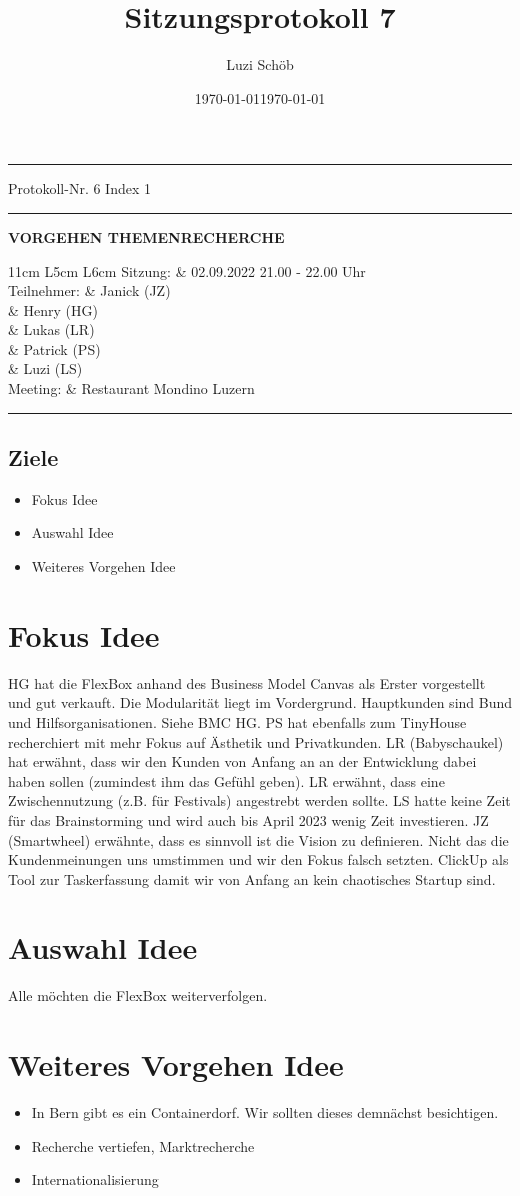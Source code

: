 \documentclass[10pt]{extarticle}
\date{}
\date{\today}
\makeatletter
\renewenvironment{abstract}
 {\par\noindent\ignorespaces}
 {\par\medskip}
\renewcommand{\maketitle}{\setlength{\parindent}{0pt}
\begin{flushleft}
  \huge\@title
  \par\vspace{1cm}
  \normalsize\@author
  \vspace{1cm}  
  
  \hrule
  \begin{minipage}[t]{\textwidth}
    \begin{minipage}[t]{0.25\textwidth}
    \vspace{0.3cm}
	Protokoll-Nr. 6 
	Index 1
    \vspace{0.3cm}
	\hrule
	\vspace{0.3cm}
	\date{\today}
	\vspace{0.3cm}
	\end{minipage}
	\begin{minipage}[t]{0.05\textwidth}
	 \hfill
	\end{minipage}
	\begin{minipage}[t]{0.70\textwidth}
	\begin{flushleft}    
	\vspace{0.3cm}
	\textbf{VORGEHEN THEMENRECHERCHE}
	\vspace{0.3cm}
	
\begin{tabularx}{11cm} { 
   L{5cm}
   L{6cm}
  }
 \toprule
 Sitzung: & 02.09.2022 21.00 - 22.00 Uhr\\
 Teilnehmer: & Janick (JZ) \\
 			& Henry (HG) \\
 			& Lukas (LR) \\
            & Patrick (PS)\\
			& Luzi (LS) \\
 Meeting: & Restaurant Mondino Luzern \\
 \end{tabularx}	
\begin{abstract}
\end{abstract}
\end{flushleft}
    \vspace{0.3cm}
	\end{minipage}
  \end{minipage}
  
  \hrule
\end{flushleft}
\vspace{1cm}

}
\makeatother
\begin{document}
\title{Sitzungsprotokoll 7}
\author{Luzi Schöb}
\maketitle


\colorbox{light-gray}{\begin{minipage}{17cm}
\vspace{0.25cm}
\section*{Ziele}
\begin{itemize}
\item Fokus Idee
\item Auswahl Idee
\item Weiteres Vorgehen Idee
\end{itemize}
\vspace{0.25cm}
\end{minipage}}

\section{Fokus Idee}
HG hat die FlexBox anhand des Business Model Canvas als Erster vorgestellt und gut verkauft. Die Modularität liegt im Vordergrund. Hauptkunden sind Bund und Hilfsorganisationen. Siehe BMC HG. PS hat ebenfalls zum TinyHouse recherchiert mit mehr Fokus auf Ästhetik und Privatkunden. LR (Babyschaukel) hat erwähnt, dass wir den Kunden von Anfang an an der Entwicklung dabei haben sollen (zumindest ihm das Gefühl geben). LR erwähnt, dass eine Zwischennutzung (z.B. für Festivals) angestrebt werden sollte. LS hatte keine Zeit für das Brainstorming und wird auch bis April 2023 wenig Zeit investieren. JZ (Smartwheel) erwähnte, dass es sinnvoll ist die Vision zu definieren. Nicht das die Kundenmeinungen uns umstimmen und wir den Fokus falsch setzten. ClickUp als Tool zur Taskerfassung damit wir von Anfang an kein chaotisches Startup sind. 

\section{Auswahl Idee}
Alle möchten die FlexBox weiterverfolgen.


\section{Weiteres Vorgehen Idee}
\begin{itemize}
\item In Bern gibt es ein Containerdorf. Wir sollten dieses demnächst besichtigen.
\item Recherche vertiefen, Marktrecherche
\item Internationalisierung
\end{itemize}
\end{document}
